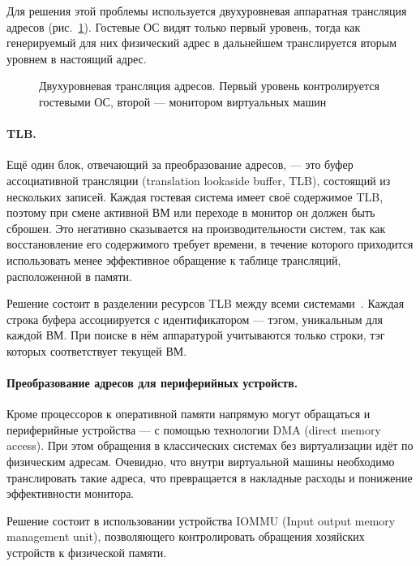 Для решения этой проблемы используется двухуровневая аппаратная трансляция адресов (рис.~\ref{fig:two-level-translation}). Гостевые ОС видят только первый уровень, тогда как генерируемый для них физический адрес в дальнейшем транслируется вторым уровнем в настоящий адрес.

\begin{figure}[htb]
    \centering
    \caption[Двухуровневая трансляция адресов]{Двухуровневая трансляция адресов. Первый уровень контролируется гостевыми ОС, второй --- монитором виртуальных машин}
    \label{fig:two-level-translation}
\end{figure}

\paragraph{TLB.} Ещё один блок, отвечающий за преобразование адресов, --- это буфер ассоциативной трансляции (\abbr translation lookaside buffer, TLB), состоящий из нескольких записей. Каждая гостевая система имеет своё содержимое TLB, поэтому при смене активной ВМ или переходе в монитор он должен быть сброшен. Это негативно сказывается на производительности систем, так как восстановление его содержимого требует времени, в течение которого приходится использовать менее эффективное обращение к таблице трансляций, расположенной в памяти.

Решение состоит в разделении ресурсов TLB между всеми системами~\cite{YANG:2008}. Каждая строка буфера ассоциируется с идентификатором --- тэгом, уникальным для каждой ВМ. При поиске в нём аппаратурой учитываются только строки, тэг которых соответствует текущей ВМ.

\paragraph{Преобразование адресов для периферийных устройств.} Кроме процессоров к оперативной памяти напрямую могут обращаться и периферийные устройства ---  с помощью технологии DMA (\abbr direct memory access). При этом обращения в классических системах без виртуализации идёт по физическим адресам. Очевидно, что внутри виртуальной машины необходимо транслировать такие адреса, что превращается в накладные расходы и понижение эффективности монитора. 

Решение состоит в использовании устройства IOMMU (\abbr Input output memory management unit), позволяющего контролировать обращения хозяйских устройств к физической памяти. 

